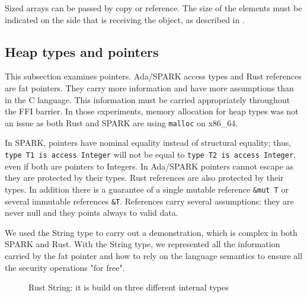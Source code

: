 \documentclass[nomenclature, english, bibtex]{kththesis}
\newcommand{\inlinecode}[1]{\texttt{#1}}
\begin{document}
Sized arrays can be passed by copy or reference. The size of the elements must be indicated on the side that is receiving the object, as described in .

\subsection{Heap types and pointers}

This subsection examines pointers. Ada/SPARK access types and Rust references are fat pointers. They carry more information and have more assumptions than in the C language. This information must be carried appropriately throughout the FFI barrier. In those experiments, memory allocation for heap types was not an issue as both Rust\cite{santos_investigating_2022} and SPARK are using \texttt{malloc} on x86\_64.


In SPARK, pointers have nominal equality instead of structural equality; thus, \inlinecode{type T1 is access Integer} will not be equal to \inlinecode{type T2 is access Integer}, even if both are pointers to Integers. In Ada/SPARK pointers cannot escape as they are protected by their types. Rust references are also protected by their types. In addition there is a guarantee of a single mutable reference \texttt{\&mut T} or several immutable references \texttt{\&T}. References carry several assumptions: \first they are never null and \Second they points always to valid data.

We used the String type to carry out a demonstration, which is complex in both SPARK and Rust. With the String type, we represented all the information carried by the fat pointer and how to rely on the language semantics to ensure all the security operations "for free".



\begin{figure}[ht!]
    \centering
  \caption{Rust String: it is build on three different internal types}
  \label{fig:ruststring}
\end{figure}
\end{document}

